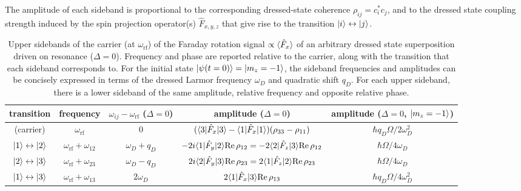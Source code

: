\documentclass[aps,prl,reprint,superscriptaddress,floatfix]{revtex4-1}
\begin{document}
The amplitude of each sideband is proportional to the corresponding dressed-state coherence $\rho_{ij} = c_i^* c_j $, and to the dressed state coupling strength induced by the spin projection operator(s) $\hat{F}_{x,y,z}$ that give rise to the transition $\vert i \rangle  \leftrightarrow \vert j \rangle $.
\begin{table*}[t]
    \caption{Upper sidebands of the carrier (at $\omega_{\text{rf}}$) of the Faraday rotation signal $\propto \langle \hat{F}_x \rangle$ of an arbitrary dressed state superposition driven on resonance ($\Delta = 0$).
    Frequency and phase are reported relative to the carrier, along with the transition that each sideband corresponds to.
    For the initial state $\vert \psi(t=0) \rangle =\vert m_z=-1 \rangle $, the sideband frequencies and amplitudes can be concisely expressed in terms of the dressed Larmor frequency $\omega_D$ and quadratic shift $q_D$. 
    For each upper sideband, there is a lower sideband of the same amplitude, relative frequency and opposite relative phase.
    \label{tab:sidebands}
    }
    \begin{ruledtabular}
    \begin{tabular}{ccccc}
    transition & frequency & $\omega_{ij} - \omega_{\text{rf}}$ ($\Delta=0$) & amplitude ($\Delta = 0$) & amplitude ($\Delta = 0$, $\vert m_z=-1 \rangle $) \\ \hline
     (carrier) & $\omega_{\text{rf}}$ & 0 & $(\langle 3 \vert  \hat{F}_x \vert 3 \rangle  - \langle 1 \vert  \hat{F}_x \vert 1 \rangle ) (\rho_{33} - \rho_{11})$  & $\hbar q_D \Omega/2 \omega_D^2$ \\
     $\vert 1 \rangle  \leftrightarrow \vert 2 \rangle $ & $\omega_{\text{rf}} + \omega_{12}$ & $\omega_D+q_D$ & $-2i \langle 1 \vert  \hat{F}_y \vert 2 \rangle  \text{Re}\,\rho_{12} = -2 \langle 2 \vert  \hat{F}_z \vert 3 \rangle  \text{Re}\,\rho_{12}$ & $\hbar \Omega/4 \omega_D$ \\
     $\vert 2 \rangle  \leftrightarrow \vert 3 \rangle $ & $\omega_{\text{rf}} + \omega_{23}$ & $\omega_D-q_D$ & $2i \langle 2 \vert  \hat{F}_y \vert 3 \rangle  \text{Re}\,\rho_{23} = 2 \langle 1 \vert  \hat{F}_z \vert 2 \rangle  \text{Re}\,\rho_{23}$ & $\hbar \Omega/4 \omega_D$ \\
     $\vert 1 \rangle  \leftrightarrow \vert 3 \rangle $ & $\omega_{\text{rf}} + \omega_{13}$ & $2\omega_D$ & $2 \langle 1 \vert  \hat{F}_x \vert 3 \rangle  \text{Re}\,\rho_{13}$ & $\hbar q_D \Omega/4 \omega_D^2$
    \end{tabular}
    \end{ruledtabular}
\end{table*}
\end{document}
